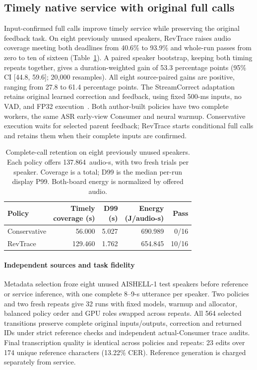 \subsection{Timely native service with original full calls}
\label{subsec:native_retention_eval}
Input-confirmed full calls improve timely service while preserving the
original feedback task. On eight previously unused speakers, RevTrace
raises audio coverage meeting both deadlines from 40.6\% to 93.9\% and
whole-run passes from zero to ten of sixteen
(Table~\ref{tab:native_full_confirm}). A paired speaker bootstrap,
keeping both timing repeats together, gives a duration-weighted gain
of 53.3 percentage points (95\% CI [44.8, 59.6]; 20,000 resamples).
All eight source-paired gains are positive, ranging from 27.8 to 61.4
percentage points.
The StreamCorrect adaptation retains
original learned correction and feedback, using fixed 500-ms inputs,
no VAD, and FP32 execution~\cite{vu2026streamcorrect}. Both author-built
policies have two complete workers, the same ASR early-view Consumer and
neural warmup. Conservative execution waits for selected parent feedback;
RevTrace starts conditional full calls and retains them when their
complete inputs are confirmed.

\begin{table}[t]
\centering
\caption{Complete-call retention on eight previously unused speakers.
Each policy offers 137.864~audio-s, with two fresh trials per speaker.
Coverage is a total; D99 is the median per-run display P99.
Both-board energy is normalized by offered audio.}
\label{tab:native_full_confirm}
\small\setlength{\tabcolsep}{3pt}
\begin{tabular}{@{}lrrrr@{}}
\toprule
Policy & \shortstack{Timely\\coverage (s)} & \shortstack{D99\\(s)} &
\shortstack{Energy\\(J/audio-s)} & Pass\\
\midrule
Conservative & 56.000 & 5.027 & 690.989 & 0/16\\
RevTrace & 129.460 & 1.762 & 654.845 & 10/16\\
\bottomrule
\end{tabular}
\end{table}

\paragraph{Independent sources and task fidelity}
Metadata selection froze eight unused AISHELL-1 test speakers
\cite{bu2017aishell} before reference or service inference, with one complete
8--9-s utterance per speaker. Two policies and two fresh repeats give
32 runs with fixed models, warmup and allocator, balanced policy order
and GPU roles swapped across repeats. All 564 selected transitions
preserve complete original inputs/outputs, correction and returned IDs
under strict reference checks and independent actual-Consumer trace
audits. Final transcription quality is identical across policies and
repeats: 23 edits over 174 unique reference characters (13.22\% CER).
Reference generation is charged separately from service.

